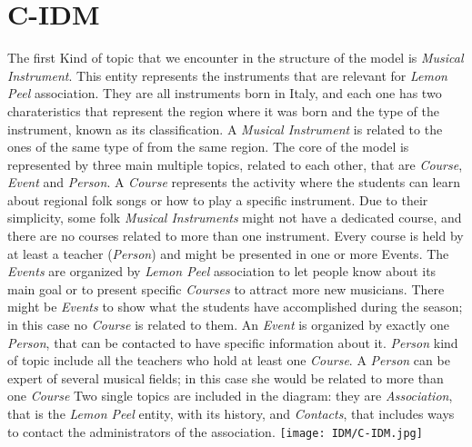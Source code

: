 \documentclass[../../DD.tex]{subfiles}
\begin{document}
\section{C-IDM}
	The first Kind of topic that we encounter in the structure of the model is \textit{Musical Instrument}. This entity represents the instruments that are relevant for \textit{Lemon Peel} association. They are all instruments born in Italy, and each one has two charateristics that represent the region where it was born and the type of the instrument, known as its classification. A \textit{Musical Instrument} is related to the ones of the same type of from the same region.
	\newline
	The core of the model is represented by three main multiple topics, related to each other, that are \textit{Course}, \textit{Event} and \textit{Person}. A \textit{Course} represents the activity where the students can learn about regional folk songs or how to play a specific instrument. Due to their simplicity, some folk \textit{Musical Instruments} might not have a dedicated course, and there are no courses related to more than one instrument. Every course is held by at least a teacher (\textit{Person}) and might be presented in one or more Events.
	\newline
	The \textit{Events} are organized by \textit{Lemon Peel} association to let people know about its main goal or to present specific \textit{Courses} to attract more new musicians. There might be \textit{Events} to show what the students have accomplished during the season; in this case no \textit{Course} is related to them. An \textit{Event} is organized by exactly one \textit{Person}, that can be contacted to have specific information about it. 
	\newline
	\textit{Person} kind of topic include all the teachers who hold at least one \textit{Course}. A \textit{Person} can be expert of several musical fields; in this case she would be related to more than one \textit{Course}
	\newline
	Two single topics are included in the diagram: they are \textit{Association}, that is the \textit{Lemon Peel} entity, with its history, and \textit{Contacts}, that includes ways to contact the administrators of the association.
	\newline
	\texttt{[image: IDM/C-IDM.jpg]}
\end{document}
